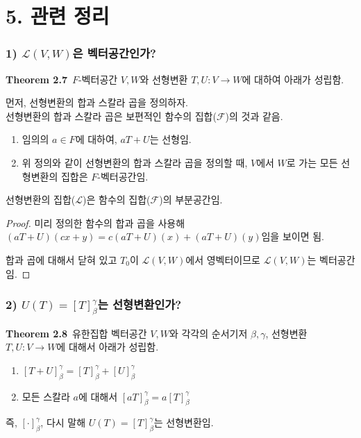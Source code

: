 \section*{5. 관련 정리}

\subsubsection*{1) $\mathcal{L}(V,W)$은 벡터공간인가?}
\textbf{Theorem 2.7}\, $F$-벡터공간 $V,W$와 선형변환 $T,U:V \rightarrow W$에 대하여 아래가 성립함.

먼저, 선형변환의 합과 스칼라 곱을 정의하자.\\
선형변환의 합과 스칼라 곱은 보편적인 함수의 집합($\mathcal{F}$)의 것과 같음.

\begin{enumerate}
    \item 임의의 $a \in F$에 대하여, $aT+U$는 선형임.
    \item 위 정의와 같이 선형변환의 합과 스칼라 곱을 정의할 때, $V$에서 $W$로 가는 모든 선형변환의 집합은 $F$-벡터공간임.
\end{enumerate}

선형변환의 집합($\mathcal{L}$)은 함수의 집합($\mathcal{F}$)의 부분공간임.

\begin{proof}
미리 정의한 함수의 합과 곱을 사용해 $(aT+U)(cx+y)=c(aT+U)(x)+(aT+U)(y)$임을 보이면 됨.

합과 곱에 대해서 닫혀 있고 $T_0$이 $\mathcal{L}(V,W)$에서 영벡터이므로 $\mathcal{L}(V,W)$는 벡터공간임.
\end{proof}


\subsubsection*{2) $U(T)=[T]_{\beta}^{\gamma}$는 선형변환인가?}
\textbf{Theorem 2.8}\, 유한집합 벡터공간 $V,W$와 각각의 순서기저 $\beta,\gamma$, 선형변환 $T,U:V \rightarrow W$에 대해서 아래가 성립함.

\begin{enumerate}
    \item $[T+U]_{\beta}^{\gamma}=[T]_{\beta}^{\gamma}+[U]_{\beta}^{\gamma}$
    \item 모든 스칼라 $a$에 대해서 $[aT]_{\beta}^{\gamma}=a[T]_{\beta}^{\gamma}$
\end{enumerate}

즉, $[\cdot]_{\beta}^{\gamma}$, 다시 말해 $U(T)=[T]_{\beta}^{\gamma}$는 선형변환임.

